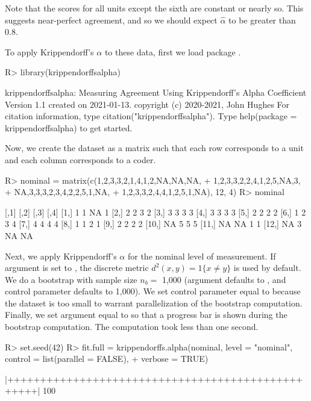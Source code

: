 Note that the scores for all units except the sixth are constant or nearly so. This suggests near-perfect agreement, and so we should expect $\hat{\alpha}$ to be greater than 0.8.

To apply Krippendorff's $\alpha$ to these data, first we load package .

\begin{example}
R> library(krippendorffsalpha)

krippendorffsalpha: Measuring Agreement Using Krippendorff's Alpha Coefficient
Version 1.1 created on 2021-01-13.
copyright (c) 2020-2021, John Hughes
For citation information, type citation("krippendorffsalpha").
Type help(package = krippendorffsalpha) to get started.
\end{example}

Now, we create the dataset as a matrix such that each row corresponds to a unit and each column corresponds to a coder.

\begin{example}
R> nominal = matrix(c(1,2,3,3,2,1,4,1,2,NA,NA,NA,
+                     1,2,3,3,2,2,4,1,2,5,NA,3,
+                     NA,3,3,3,2,3,4,2,2,5,1,NA,
+                     1,2,3,3,2,4,4,1,2,5,1,NA), 12, 4)
R> nominal

      [,1] [,2] [,3] [,4]
 [1,]    1    1   NA    1
 [2,]    2    2    3    2
 [3,]    3    3    3    3
 [4,]    3    3    3    3
 [5,]    2    2    2    2
 [6,]    1    2    3    4
 [7,]    4    4    4    4
 [8,]    1    1    2    1
 [9,]    2    2    2    2
[10,]   NA    5    5    5
[11,]   NA   NA    1    1
[12,]   NA    3   NA   NA
\end{example}

Next, we apply Krippendorff's $\alpha$ for the nominal level of measurement. If argument  is set to , the discrete metric $d^2(x,y)=1\{x\neq y\}$ is used by default. We do a bootstrap with sample size $n_b=$ 1,000 (argument  defaults to , and control parameter  defaults to 1,000). We set control parameter  equal to  because the dataset is too small to warrant parallelization of the bootstrap computation. Finally, we set argument  equal to  so that a progress bar is shown during the bootstrap computation. The computation took less than one second.

\begin{example}
R> set.seed(42)
R> fit.full = krippendorffs.alpha(nominal, level = "nominal", control = list(parallel = FALSE),
+                                 verbose = TRUE)

  |++++++++++++++++++++++++++++++++++++++++++++++++++| 100%
\end{example}

